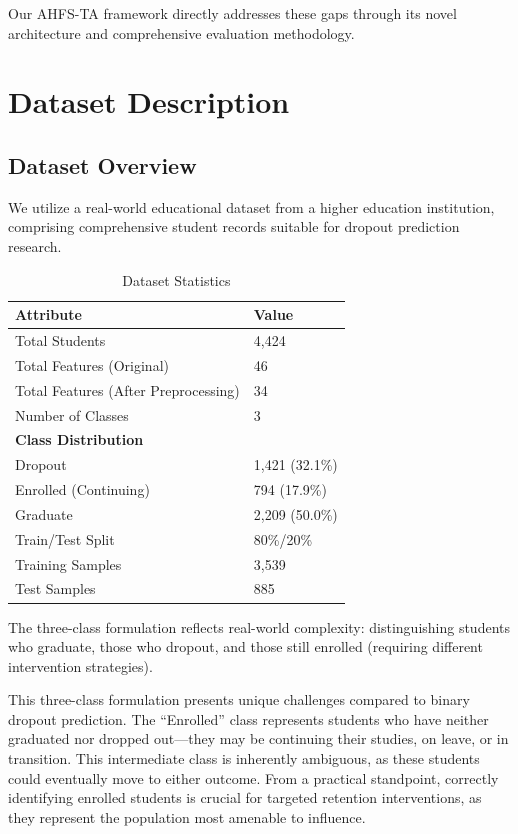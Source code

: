 \documentclass[journal]{IEEEtran}
\begin{document}
Our AHFS-TA framework directly addresses these gaps through its novel architecture and comprehensive evaluation methodology.

\section{Dataset Description}

\subsection{Dataset Overview}

We utilize a real-world educational dataset from a higher education institution, comprising comprehensive student records suitable for dropout prediction research.

\begin{table}[h]
\centering
\caption{Dataset Statistics}
\label{tab:dataset_stats}
\begin{tabular}{ll}
\toprule
\textbf{Attribute} & \textbf{Value} \\
\midrule
Total Students & 4,424 \\
Total Features (Original) & 46 \\
Total Features (After Preprocessing) & 34 \\
Number of Classes & 3 \\
\midrule
\multicolumn{2}{l}{\textbf{Class Distribution}} \\
\quad Dropout & 1,421 (32.1\%) \\
\quad Enrolled (Continuing) & 794 (17.9\%) \\
\quad Graduate & 2,209 (50.0\%) \\
\midrule
Train/Test Split & 80\%/20\% \\
Training Samples & 3,539 \\
Test Samples & 885 \\
\bottomrule
\end{tabular}
\end{table}

The three-class formulation reflects real-world complexity: distinguishing students who graduate, those who dropout, and those still enrolled (requiring different intervention strategies).

This three-class formulation presents unique challenges compared to binary dropout prediction. The ``Enrolled'' class represents students who have neither graduated nor dropped out---they may be continuing their studies, on leave, or in transition. This intermediate class is inherently ambiguous, as these students could eventually move to either outcome. From a practical standpoint, correctly identifying enrolled students is crucial for targeted retention interventions, as they represent the population most amenable to influence.
\end{document}
